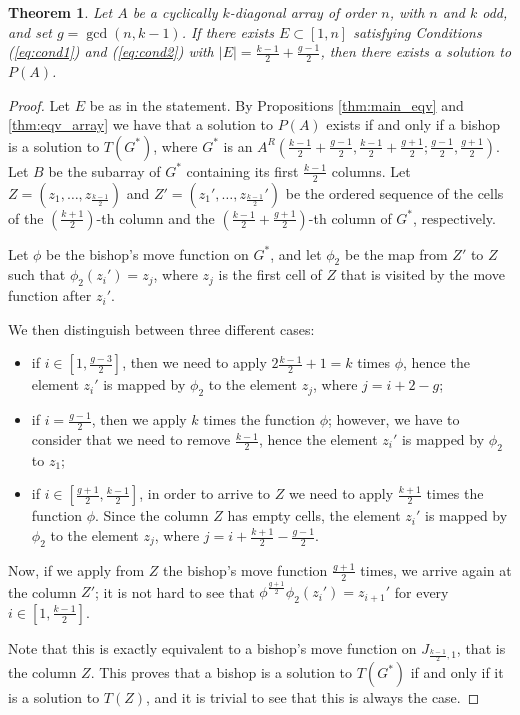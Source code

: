 \documentclass{amsart}
\newtheorem{thm}[prop]{Theorem}
\theoremstyle{definition}
\numberwithin{equation}{section}
\begin{document}
\begin{thm} \label{prop:case2}
Let $A$ be a cyclically $k$-diagonal array of order $n$, with $n$ and $k$ odd, and set $g=\gcd(n,k-1)$.
If there exists $E \subset[1,n]$ satisfying Conditions (\ref{eq:cond1}) and (\ref{eq:cond2}) with $|E|= \frac{k-1}{2} + \frac{g-1}{2}$, then there exists a solution to $P(A)$.
\end{thm}
\begin{proof}
Let $E$ be as in the statement. By Propositions \ref{thm:main_eqv} and \ref{thm:eqv_array} we have that a solution to $P(A)$ exists if and only if a bishop is a solution to $T(G^*)$, where $G^*$ is an $A^{R}(\frac{k-1}{2} + \frac{g-1}{2}, \frac{k-1}{2} + \frac{g+1}{2}; \frac{g-1}{2}, \frac{g+1}{2})$. Let $B$ be the subarray of $G^*$ containing its first $\frac{k-1}{2}$ columns. Let $Z =(z_1, \dotsc, z_{\frac{k-1}{2}})$ and $Z' =(z_1', \dotsc, z_{\frac{k-1}{2}}')$ be the ordered sequence of the cells of the $(\frac{k+1}{2})$-th column and the $(\frac{k-1}{2} + \frac{g+1}{2})$-th column  of $G^*$, respectively. 

 Let $\phi$ be the bishop's move function on $G^*$, and let $\phi_2$ be the map from $Z'$ to $Z$ such that
$\phi_2(z_i') = z_j$, where $z_j$ is the first cell of $Z$ that is visited by the move function after $z_i'$. 

We then distinguish between three different cases:
\begin{itemize}
	\item if $i \in[1,\frac{g-3}{2}]$, then we need to apply $2 \frac{k-1}{2}+1 = k$ times $\phi$, hence the element $z_i'$ is mapped by $\phi_2$ to the element $z_j$, where $j = i+2-g$;
	\item if $i = \frac{g-1}{2}$, then we apply $k$ times the function $\phi$; however, we have to consider that we need to remove $\frac{k-1}{2}$, hence the element $z_i'$ is mapped by $\phi_2$ to $z_1$;
    	\item if $i \in[\frac{g+1}{2}, \frac{k-1}{2}]$, in order to arrive to $Z$ we need to apply $\frac{k+1}{2}$ times the function $\phi$. Since the column $Z$ has empty cells, the element $z_i'$ is mapped by $\phi_2$ to the element $z_j$, where $j = i+ \frac{k+1}{2}-\frac{g-1}{2}$. 
\end{itemize}
Now, if we apply from $Z$ the bishop's move function $\frac{g+1}{2}$ times, we arrive again at the column $Z'$; it is not hard to see that
$ \phi^{\frac{g+1}{2}} 	\phi_2(z_i') = z_{i+1}'$  for every $i \in [1,\frac{k-1}{2}]$.

Note that this is exactly equivalent to a bishop's move function on  $J_{\frac{k-1}{2},1}$, that is the column $Z$. This proves that a bishop is a solution to $T(G^*)$ if and only if it is a solution to $T(Z)$, and it is trivial to see that this is always the case. 
\end{proof}
\end{document}
